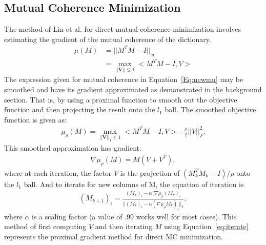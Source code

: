 \documentclass[journal]{IEEEtran}
\begin{document}
\subsection{Mutual Coherence Minimization}
The method of Lin et al. for direct mutual coherence minimization involves estimating the gradient 
of the mutual coherence of the  dictionary.
\begin{align}
    \mu(M) &= ||M^T M - I||_\infty \\
     &= \max_{||\mathbf{V}|| \leq 1} <M^T M - I, V>
     \label{Eq:newmu}
\end{align}
The expression given for mutual coherence in Equation~\ref{Eq:newmu} may be smoothed and have its gradient
approximated as demonstrated in the background section. That is, by using a proximal function 
to smooth out the objective function and then projecting the result onto the $l_1$ ball. The smoothed
objective function is given as:
\begin{align}
    \mu_{\rho}(M) = \max_{||\mathbf{V}||_1 \leq 1} <M^T M - I, V> - \frac{\rho}{2}||V||_F^2.
\end{align}
This smoothed approximation has gradient:
\begin{align}
    \nabla \mu_\rho(M) = M(V + V^T),
\end{align}
where at each iteration, the factor $V$ is
the projection of $(M_k^T M_k - I)/ \rho $ onto the $l_1$ ball.
And to iterate for new columns of M, the equation of iteration is
\begin{align}
    (M_{k+1})_i = \frac{(M_k)_i - \alpha (\nabla \mu_\rho(M_k)_i}{||(M_k)_i 
    - \alpha (\nabla \mu_\rho M_k)_i||_2},
\label{eq:iterate}
\end{align}
where $\alpha$ is a scaling factor (a value of .99 works well for most cases). This method of first computing $V$ and then iterating $M$ using
Equation~\ref{eq:iterate} represents the proximal gradient method for direct MC minimization.
\end{document}
